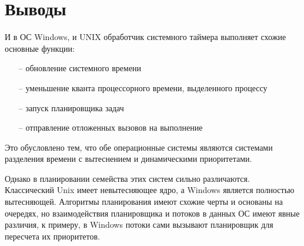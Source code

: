 \section{Выводы}

И в ОС Windows, и UNIX обработчик системного таймера выполняет
схожие основные функции:

\begin{itemize}
    \item[--] обновление системного времени
    \item[--] уменьшение кванта процессорного времени,
        выделенного процессу
    \item[--] запуск планировщика задач
    \item[--] отправление отложенных вызовов на выполнение
\end{itemize}

Это обусловлено тем, что обе операционные системы являются
системами разделения времени с вытеснением и динамическими
приоритетами.

Однако в планировании семейства этих систем сильно различаются.
Классический Unix имеет невытесняющее ядро, а Windows является
полностью вытесняющей. Алгоритмы планирования имеют схожие черты
и основаны на очередях, но взаимодействия планировщика и потоков
в данных ОС имеют явные различия, к примеру, в Windows потоки сами
вызывают планировщик для пересчета их приоритетов.
